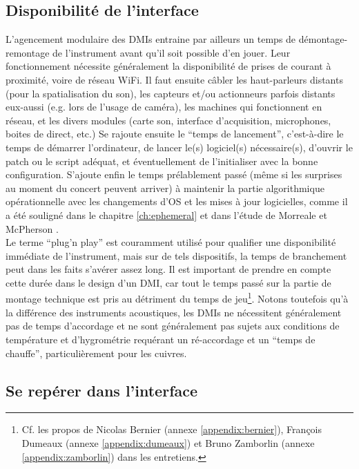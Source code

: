 \subsection{Disponibilité de l'interface}

\noindent L'agencement modulaire des \glspl{DMI} entraine par ailleurs un temps de démontage-remontage de l'instrument avant qu'il soit possible d'en jouer. Leur fonctionnement nécessite généralement la disponibilité de prises de courant à proximité, voire de réseau WiFi. Il faut ensuite câbler les haut-parleurs distants (pour la spatialisation du son), les capteurs et/ou actionneurs parfois distants eux-aussi (e.g. lors de l'usage de caméra), les machines qui fonctionnent en réseau, et les divers modules (carte son, interface d'acquisition, microphones, boites de direct, etc.) Se rajoute ensuite le ``temps de lancement'', c'est-à-dire le temps de démarrer l'ordinateur, de lancer le(s) logiciel(s) nécessaire(s), d'ouvrir le patch ou le script adéquat, et éventuellement de l'initialiser avec la bonne configuration. S'ajoute enfin le temps prélablement passé (même si les surprises au moment du concert peuvent arriver) à maintenir la partie algorithmique opérationnelle avec les changements d'\gls{OS} et les mises à jour logicielles, comme il a été souligné dans le chapitre \ref{ch:ephemeral} et dans l'étude de Morreale et McPherson \cite{morreale_design_2017}.\\
\indent Le terme ``plug'n play'' est couramment utilisé pour qualifier une disponibilité immédiate de l'instrument, mais sur de tels dispositifs, la temps de branchement peut dans les faits s'avérer assez long. Il est important de prendre en compte cette durée dans le design d'un \gls{DMI}, car tout le temps passé sur la partie de montage technique est pris au détriment du temps de jeu\footnote{Cf. les propos de Nicolas Bernier (annexe \ref{appendix:bernier}), François Dumeaux (annexe \ref{appendix:dumeaux}) et Bruno Zamborlin (annexe \ref{appendix:zamborlin}) dans les entretiens.}. Notons toutefois qu'à la différence des instruments acoustiques, les \glspl{DMI} ne nécessitent généralement pas de temps d'accordage et ne sont généralement pas sujets aux conditions de température et d'hygrométrie requérant un ré-accordage et un ``temps de chauffe'', particulièrement pour les cuivres.


\subsection{Se repérer dans l'interface}

